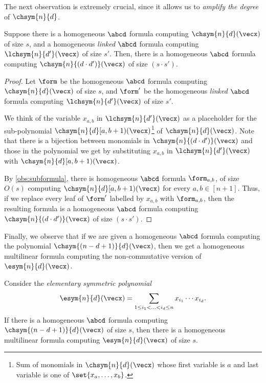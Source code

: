 \noindent The next observation is extremely crucial, since it allows us to \emph{amplify the degree} of $\chsym{n}{d}$. 

\begin{observation}\label{obs:amplifyDeg}
	Suppose there is a homogeneous $\abcd$ formula computing $\chsym{n}{d}(\vecx)$ of size $s$, and a homogeneous \emph{linked} $\abcd$ formula computing $\lchsym{n}{d'}(\vecx)$ of size $s'$. Then, there is a homogeneous $\abcd$ formula computing $\chsym{n}{(d \cdot d')}(\vecx)$ of size $(s \cdot s')$.
\end{observation}

\begin{proof}
	Let $\form$ be the homogeneous $\abcd$ formula computing $\chsym{n}{d}(\vecx)$ of size $s$, and $\form'$ be the homogeneous \emph{linked} $\abcd$ formula computing $\lchsym{n}{d'}(\vecx)$ of size $s'$.

	We think of the variable $x_{a,b}$ in $\lchsym{n}{d'}(\vecx)$ as a placeholder for the sub-polynomial $\chsym{n}{d}[a, b+1)(\vecx)$\footnote{Sum of monomials in $\chsym{n}{d}(\vecx)$ whose first variable is $a$ and last variable is one of $\set{x_a, \ldots, x_b}$.} of $\chsym{n}{d}(\vecx)$.
	Note that there is a bijection between monomials in $\chsym{n}{(d \cdot d')}(\vecx)$ and those in the polynomial we get by substituting $x_{a,b}$ in $\lchsym{n}{d'}(\vecx)$ with $\chsym{n}{d}[a, b+1)(\vecx)$.

	By \autoref{obs:subformula}, there is homogeneous $\abcd$ formula $\form_{a,b}$, of size $O(s)$ computing $\chsym{n}{d}[a, b+1)(\vecx)$ for every $a, b \in [n+1]$.
	Thus, if we replace every leaf of $\form'$ labelled by $x_{a,b}$ with $\form_{a,b}$, then the resulting formula is a homogeneous $\abcd$ formula computing $\chsym{n}{(d\cdot d')}(\vecx)$ of size $(s \cdot s')$.
\end{proof}

Finally, we observe that if we are given a homogeneous $\abcd$ formula computing the polynomial $\chsym{(n-d+1)}{d}(\vecx)$, then we get a homogeneous multilinear formula computing the non-commutative version of $\esym{n}{d}(\vecx)$.

\begin{observation}\label{obs:chsymToEsym}
	Consider the \emph{elementary symmetric polynomial}
	\[
		\esym{n}{d}(\vecx) = \sum_{1 \leq i_1 < \ldots < i_d \leq n} x_{i_1} \cdots x_{i_d}.
	\]
	If there is a homogeneous $\abcd$ formula computing $\chsym{(n-d+1)}{d}(\vecx)$ of size $s$, then there is a homogeneous multilinear formula computing $\esym{n}{d}(\vecx)$ of size $s$.
\end{observation}

